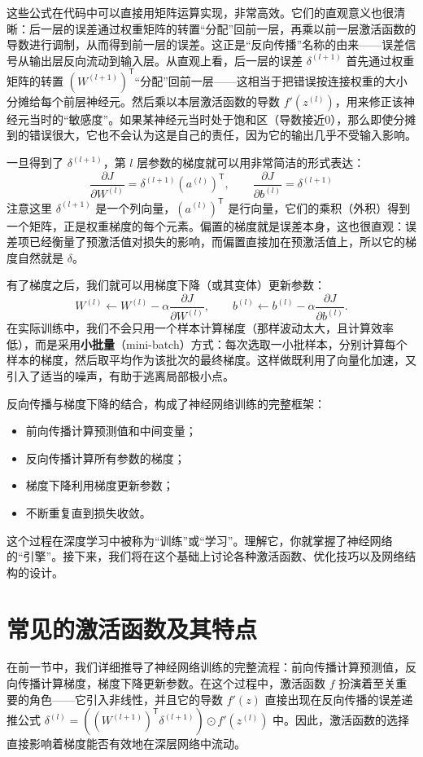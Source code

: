 \documentclass[lang=cn,zihao=-4,a4paper,fontset=windows]{beautybook}
\renewcommand{\partial}{∂}
\begin{document}
这些公式在代码中可以直接用矩阵运算实现，非常高效。它们的直观意义也很清晰：后一层的误差通过权重矩阵的转置“分配”回前一层，再乘以前一层激活函数的导数进行调制，从而得到前一层的误差。这正是“反向传播”名称的由来——误差信号从输出层反向流动到输入层。从直观上看，后一层的误差 $\delta^{(l+1)}$ 首先通过权重矩阵的转置 $(W^{(l+1)})^{\mathsf{T}}$“分配”回前一层——这相当于把错误按连接权重的大小分摊给每个前层神经元。然后乘以本层激活函数的导数 $f'(z^{(l)})$，用来修正该神经元当时的“敏感度”。如果某神经元当时处于饱和区（导数接近0），那么即使分摊到的错误很大，它也不会认为这是自己的责任，因为它的输出几乎不受输入影响。

一旦得到了 $\delta^{(l+1)}$，第 $l$ 层参数的梯度就可以用非常简洁的形式表达：
\[
\frac{\partial J}{\partial W^{(l)}} = \delta^{(l+1)} (a^{(l)})^{\mathsf{T}}, \qquad 
\frac{\partial J}{\partial b^{(l)}} = \delta^{(l+1)}
\]
注意这里 $\delta^{(l+1)}$ 是一个列向量，$(a^{(l)})^{\mathsf{T}}$ 是行向量，它们的乘积（外积）得到一个矩阵，正是权重梯度的每个元素。偏置的梯度就是误差本身，这也很直观：误差项已经衡量了预激活值对损失的影响，而偏置直接加在预激活值上，所以它的梯度自然就是 $\delta$。

有了梯度之后，我们就可以用梯度下降（或其变体）更新参数：
\[
W^{(l)} \leftarrow W^{(l)} - \alpha \frac{\partial J}{\partial W^{(l)}}, \qquad 
b^{(l)} \leftarrow b^{(l)} - \alpha \frac{\partial J}{\partial b^{(l)}}.
\]
在实际训练中，我们不会只用一个样本计算梯度（那样波动太大，且计算效率低），而是采用\textbf{小批量}（mini-batch）方式：每次选取一小批样本，分别计算每个样本的梯度，然后取平均作为该批次的最终梯度。这样做既利用了向量化加速，又引入了适当的噪声，有助于逃离局部极小点。

\begin{fancybox}
反向传播与梯度下降的结合，构成了神经网络训练的完整框架：
\begin{itemize}
    \item 前向传播计算预测值和中间变量；
    \item 反向传播计算所有参数的梯度；
    \item 梯度下降利用梯度更新参数；
    \item 不断重复直到损失收敛。
\end{itemize}
这个过程在深度学习中被称为“训练”或“学习”。理解它，你就掌握了神经网络的“引擎”。接下来，我们将在这个基础上讨论各种激活函数、优化技巧以及网络结构的设计。
\end{fancybox}

\section{常见的激活函数及其特点}
在前一节中，我们详细推导了神经网络训练的完整流程：前向传播计算预测值，反向传播计算梯度，梯度下降更新参数。在这个过程中，激活函数 $f$ 扮演着至关重要的角色——它引入非线性，并且它的导数 $f'(z)$ 直接出现在反向传播的误差递推公式 $\delta^{(l)} = ((W^{(l+1)})^{\mathsf{T}} \delta^{(l+1)}) \odot f'(z^{(l)})$ 中。因此，激活函数的选择直接影响着梯度能否有效地在深层网络中流动。
\end{document}
